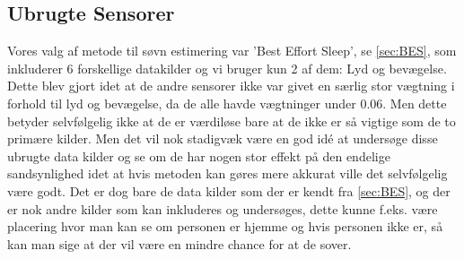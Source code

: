 \subsection{Ubrugte Sensorer}
Vores valg af metode til søvn estimering var 'Best Effort Sleep', se \cref{sec:BES}, som inkluderer 6 forskellige datakilder og vi bruger kun 2 af dem: Lyd og bevægelse. 
Dette blev gjort idet at de andre sensorer ikke var givet en særlig stor vægtning i forhold til lyd og bevægelse, da de alle havde vægtninger under 0.06. Men dette betyder selvfølgelig ikke at de er værdiløse bare at de ikke er så vigtige som de to primære kilder.
Men det vil nok stadigvæk være en god idé at undersøge disse ubrugte data kilder og se om de har nogen stor effekt på den endelige sandsynlighed idet at hvis metoden kan gøres mere akkurat ville det  selvfølgelig være godt. 
Det er dog bare de data kilder som der er kendt fra \cref{sec:BES}, og der er nok andre kilder som kan inkluderes og undersøges, dette kunne f.eks. være placering hvor man kan se om personen er hjemme og hvis personen ikke er, så kan man sige at der vil være en mindre chance for at de sover. 